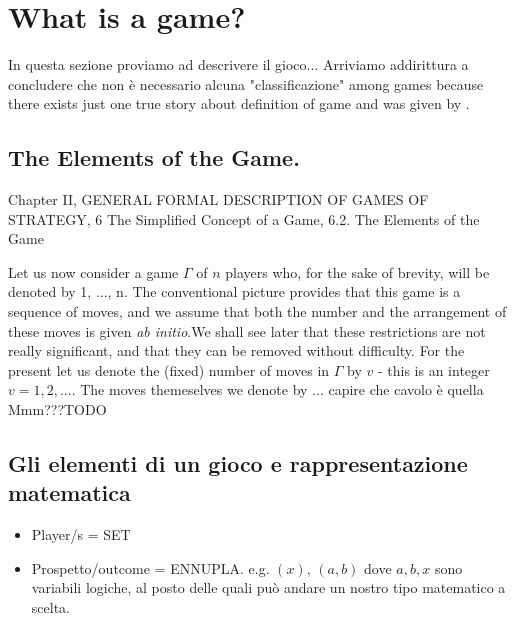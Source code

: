 \chapter{What is a game?}
In questa sezione proviamo ad descrivere il gioco... 
Arriviamo addirittura a concludere che non \`e necessario alcuna "classificazione" among games because there exists just one true story about definition of game and was given by \cite{vonNeumann1944}.

\section{The Elements of the Game. \cite{vonNeumann1944}}
Chapter II, GENERAL FORMAL DESCRIPTION OF GAMES OF STRATEGY, 6 The Simplified Concept of a Game, 6.2. The Elements of the Game

Let us now consider a game $\Gamma$ of $n$ players who, for the sake of brevity, will be denoted by 1, ..., n. The conventional picture provides that this game is a sequence of moves, and we assume that both the number and the arrangement of these moves is given \emph{ab initio}.We shall see later that these restrictions are not really significant, and that they can be removed without difficulty. For the present let us denote the (fixed) number of moves in $\Gamma$ by $v$ - this is an integer $v=1,2,...$. The moves themeselves we denote by ... capire che cavolo \`e quella Mmm???TODO

\section{Gli elementi di un gioco e rappresentazione matematica}
\begin{itemize}
 \item Player/s          = SET
 \item Prospetto/outcome = ENNUPLA. e.g. $(x)$, $(a,b)$ dove $a, b, x$ sono variabili logiche, al posto delle quali pu\`o andare un nostro tipo matematico a scelta.
\end{itemize}


